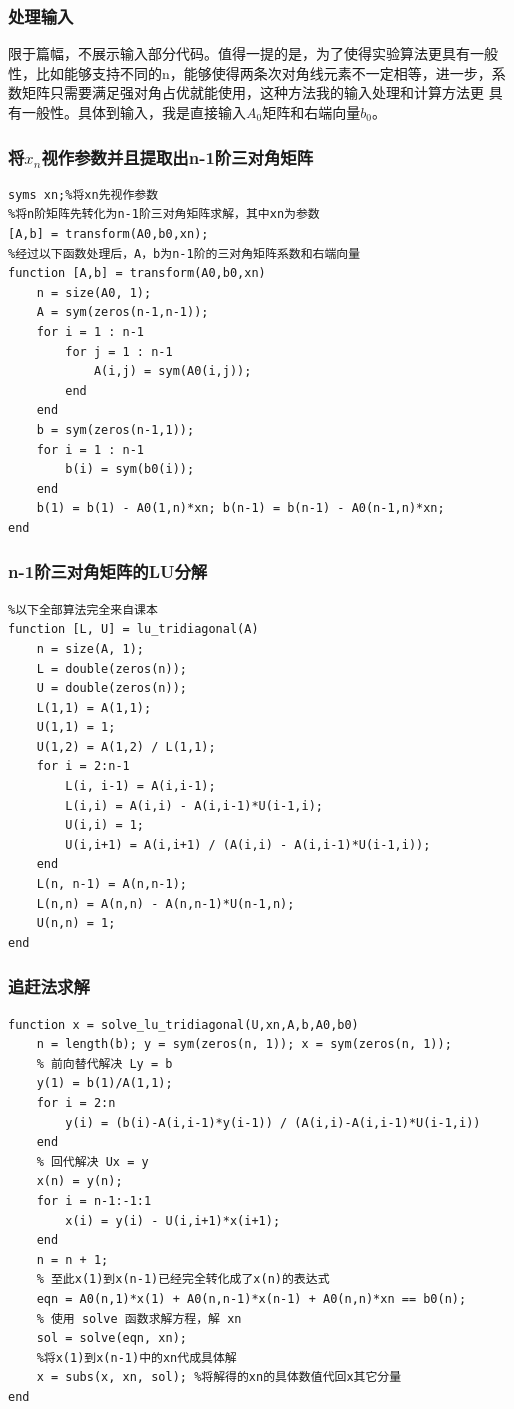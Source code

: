 \documentclass{LabReport}
\begin{document}
	\subsubsection{处理输入}
	限于篇幅，不展示输入部分代码。值得一提的是，为了使得实验算法更具有一般性，比如能够支持不同的n，能够使得两条次对角线元素不一定相等，进一步，系数矩阵只需要满足强对角占优就能使用，这种方法我的输入处理和计算方法更{\color{red} 具有一般性}。具体到输入，我是直接输入$A_0$矩阵和右端向量$b_0$。
	
	\subsubsection{将$x_n$视作参数并且提取出n-1阶三对角矩阵}
	\begin{lstlisting}
syms xn;%将xn先视作参数
%将n阶矩阵先转化为n-1阶三对角矩阵求解，其中xn为参数
[A,b] = transform(A0,b0,xn);
%经过以下函数处理后，A，b为n-1阶的三对角矩阵系数和右端向量
function [A,b] = transform(A0,b0,xn)
    n = size(A0, 1);
    A = sym(zeros(n-1,n-1));
    for i = 1 : n-1
        for j = 1 : n-1
            A(i,j) = sym(A0(i,j));
        end
    end
    b = sym(zeros(n-1,1));
    for i = 1 : n-1
        b(i) = sym(b0(i));
    end
    b(1) = b(1) - A0(1,n)*xn; b(n-1) = b(n-1) - A0(n-1,n)*xn;
end
	\end{lstlisting}
	
	\subsubsection{n-1阶三对角矩阵的LU分解}
		\begin{lstlisting}
%以下全部算法完全来自课本
function [L, U] = lu_tridiagonal(A)
    n = size(A, 1);
    L = double(zeros(n));
    U = double(zeros(n));
    L(1,1) = A(1,1);
    U(1,1) = 1;
    U(1,2) = A(1,2) / L(1,1);
    for i = 2:n-1
        L(i, i-1) = A(i,i-1);
        L(i,i) = A(i,i) - A(i,i-1)*U(i-1,i);
        U(i,i) = 1;
        U(i,i+1) = A(i,i+1) / (A(i,i) - A(i,i-1)*U(i-1,i));
    end
    L(n, n-1) = A(n,n-1);
    L(n,n) = A(n,n) - A(n,n-1)*U(n-1,n);
    U(n,n) = 1;
end
	\end{lstlisting}

	\subsubsection{追赶法求解}
	\begin{lstlisting}
function x = solve_lu_tridiagonal(U,xn,A,b,A0,b0)
    n = length(b); y = sym(zeros(n, 1)); x = sym(zeros(n, 1));
    % 前向替代解决 Ly = b
    y(1) = b(1)/A(1,1);
    for i = 2:n
        y(i) = (b(i)-A(i,i-1)*y(i-1)) / (A(i,i)-A(i,i-1)*U(i-1,i))
    end
    % 回代解决 Ux = y
    x(n) = y(n);
    for i = n-1:-1:1
        x(i) = y(i) - U(i,i+1)*x(i+1);
    end
    n = n + 1;
    % 至此x(1)到x(n-1)已经完全转化成了x(n)的表达式
    eqn = A0(n,1)*x(1) + A0(n,n-1)*x(n-1) + A0(n,n)*xn == b0(n);
    % 使用 solve 函数求解方程，解 xn
    sol = solve(eqn, xn);
    %将x(1)到x(n-1)中的xn代成具体解
    x = subs(x, xn, sol); %将解得的xn的具体数值代回x其它分量
end
	\end{lstlisting}
\end{document}
